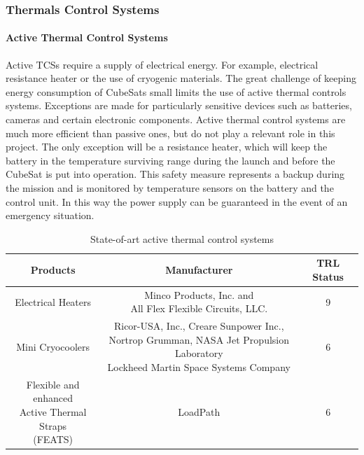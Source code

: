 \subsubsection{Thermals Control Systems}

\paragraph{Active Thermal Control Systems}

Active TCSs require a supply of electrical energy. For example, electrical resistance
heater or the use of cryogenic materials. The great challenge of keeping energy
consumption of CubeSats small limits the use of active thermal controls systems.
Exceptions are made for particularly sensitive devices such as batteries, cameras
and certain electronic components. Active thermal control systems are much more
efficient than passive ones, but do not play a relevant role in this project.
The only exception will be a resistance heater, which will keep the battery in
the temperature surviving range during the launch and before the CubeSat is put
into operation. This safety measure represents a backup during the mission and is
monitored by temperature sensors on the battery and the control unit. In this
way the power supply can be guaranteed in the event of an emergency situation.

\begin{table}[h!]
	\centering
	\begin{tabular}{c c c}
		\hline
		\textbf{Products} & \textbf{Manufacturer} & \textbf{TRL Status} \\
		\hline
		Electrical Heaters & \pbox{8cm}{Minco Products, Inc. and\\
		All Flex Flexible Circuits, LLC.} & 9 \\ \hline
		Mini Cryocoolers & \pbox{8cm}{Ricor-USA, Inc., Creare Sunpower Inc.,\\Nortrop Grumman, NASA Jet Propulsion Laboratory\\	Lockheed Martin Space Systems Company} & 6 \\ \hline
		\pbox{8cm}{Flexible and enhanced \\Active Thermal Straps\\(FEATS)} & LoadPath & 6 \\ \hline
	\end{tabular}
	\caption[State-of-art active thermal control systems]{State-of-art active thermal control systems \cite{NASA_thermal}}
	\label{tab:active_thermal}
\end{table}

